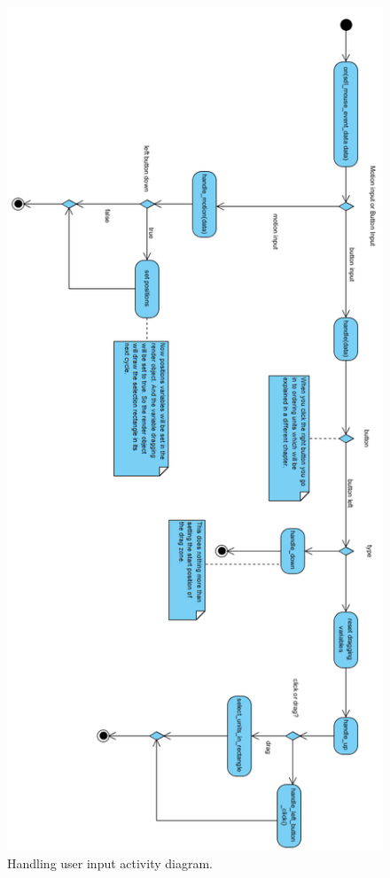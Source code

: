 \begin{figure}[!htb]
    \centering
    \includegraphics[scale=0.8]{images/ActivityDiagramMouseHandler180.PNG}
    \caption{Handling user input activity diagram.}\label{fig:fuzzy-distance}
\end{figure}

